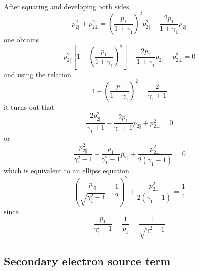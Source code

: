 After squaring and developing both sides, 
\begin{equation}
p_{2\Vert }^{2}+p_{2\bot }^{2}=\left( \frac{p_{1}}{1+\gamma _{1}}\right)
^{2}p_{2\Vert }^{2}+\frac{2p_{1}}{1+\gamma _{1}}p_{2\Vert }
\end{equation}
one obtains 
\begin{equation}
p_{2\Vert }^{2}\left[ 1-\left( \frac{p_{1}}{1+\gamma _{1}}\right) ^{2}\right]
-\frac{2p_{1}}{1+\gamma _{1}}p_{2\Vert }+p_{2\bot }^{2}=0
\end{equation}
and using the relation 
\begin{equation}
1-\left( \frac{p_{1}}{1+\gamma _{1}}\right) ^{2}=\frac{2}{\gamma _{1}+1}
\end{equation}
it turns out that 
\begin{equation}
\frac{2p_{2\Vert }^{2}}{\gamma _{1}+1}-\frac{2p_{1}}{\gamma _{1}+1}p_{2\Vert
}+p_{2\bot }^{2}=0
\end{equation}
or 
\begin{equation}
\frac{p_{2\Vert }^{2}}{\gamma _{1}^{2}-1}-\frac{p_{1}}{\gamma _{1}^{2}-1}%
p_{2\Vert }+\frac{p_{2\bot }^{2}}{2\left( \gamma _{1}-1\right) }=0
\end{equation}
which is equivalent to an ellipse equation 
\begin{equation}
\left( \frac{p_{2\Vert }}{\sqrt{\gamma _{1}^{2}-1}}-\frac{1}{2}\right) ^{2}+%
\frac{p_{2\bot }^{2}}{2\left( \gamma _{1}-1\right) }=\frac{1}{4}
\end{equation}
since 
\begin{equation}
\frac{p_{1}}{\gamma _{1}^{2}-1}=\frac{1}{p_{1}}=\frac{1}{\sqrt{\gamma
_{1}^{2}-1}}
\end{equation}

\subsection{Secondary electron source term}

